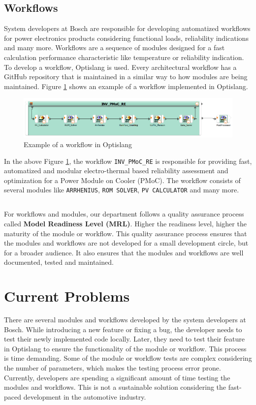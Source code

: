 \subsection{Workflows}
System developers at Bosch are responsible for developing automatized workflows for power electronics products considering functional loads, reliability indications and many more. Workflows 
are a sequence of modules designed for a fast calculation performance characteristic like temperature or reliability indication. To develop a workflow, 
Optislang is used. Every architectural workflow has a GitHub repository 
that is maintained in a similar way to how modules are being maintained. Figure \ref{workflow_example} shows an example of a workflow implemented in Optislang.
\begin{figure}[!h]
    \centering
    \includegraphics[width=\textwidth]{Images/workflow_example.png}
    \caption{Example of a workflow in Optislang}
    \label{workflow_example}
\end{figure}

In the above Figure \ref{workflow_example}, the workflow \texttt{INV\_PMoC\_RE} is responsible for providing fast, automatized and modular electro-thermal based 
reliability assessment and optimization for a Power Module on Cooler (PMoC). The workflow consists of several modules like \texttt{ARRHENIUS}, \texttt{ROM SOLVER},
\texttt{PV CALCULATOR} and many more.
\subsection*{}
For workflows and modules, our department follows a quality assurance process called \textbf{Model Readiness Level (MRL)}. Higher the readiness level, higher
the maturity of the module or workflow. This quality assurance process ensures that the modules and workflows are not developed for a small development 
circle, but for a broader audience. It also ensures that the modules and workflows are well documented, tested and maintained.

\section{Current Problems} \label{current problem}
There are several modules and workflows developed by the system developers at Bosch. While introducing a new feature or fixing a bug, the developer needs to test their
newly implemented code locally. Later, they need to test their feature in Optislang to ensure the functionality of the module or workflow. This process is 
time demanding. Some of the module or workflow tests are complex considering the number of parameters, which makes the testing process error prone. Currently, 
developers are spending a significant amount of time testing the modules and workflows. This is not a sustainable solution considering the fast-paced development in the automotive industry.

